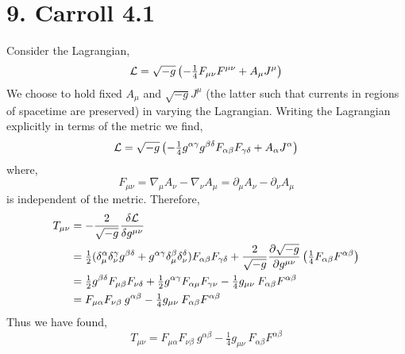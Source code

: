 \documentclass[12pt]{article}
\begin{document}
\section*{9. Carroll 4.1}

Consider the Lagrangian,
\[ \mathcal{L} = \sqrt{-g} \left( - \tfrac{1}{4} F_{\mu \nu} F^{\mu \nu} + A_\mu J^\mu \right) \]
We choose to hold fixed $A_\mu$ and $\sqrt{-g} J^\mu$ (the latter such that currents in regions of spacetime are preserved) in varying the Lagrangian. Writing the Lagrangian explicitly in terms of the metric we find,
\[ \mathcal{L} = \sqrt{-g} \left( - \tfrac{1}{4} g^{\alpha \gamma} g^{\beta \delta} F_{\alpha \beta} F_{\gamma \delta} + A_\alpha J^\alpha \right) \]
where,
\[ F_{\mu \nu} = \nabla_\mu A_\nu - \nabla_\nu A_\mu = \partial_\mu A_\nu - \partial_\nu A_\mu \]
is independent of the metric. Therefore,
\begin{align*}
T_{\mu \nu} & = - \frac{2}{\sqrt{-g}} \frac{\delta \mathcal{L}}{\delta g^{\mu \nu}}
\\
& = \tfrac{1}{2} (\delta_{\mu}^{\alpha} \delta_{\nu}^{\gamma} g^{\beta \delta} + g^{\alpha \gamma} \delta_{\mu}^{\beta} \delta_{\nu}^{\delta}) F_{\alpha \beta} F_{\gamma \delta} + \frac{2}{\sqrt{-g}} \frac{\partial \sqrt{-g}}{\partial g^{\mu \nu}} \left( \tfrac{1}{4} F_{\alpha \beta} F^{\alpha \beta} \right) 
\\
& = \tfrac{1}{2} g^{\beta \delta} F_{\mu \beta} F_{\nu \delta} + \tfrac{1}{2} g^{\alpha \gamma} F_{\alpha \mu} F_{\gamma \nu} - \tfrac{1}{4} g_{\mu \nu} \: F_{\alpha \beta} F^{\alpha \beta}   
\\
& = F_{\mu \alpha} F_{\nu \beta} \: g^{\alpha \beta} - \tfrac{1}{4} g_{\mu \nu} \: F_{\alpha \beta} F^{\alpha \beta}
\end{align*}
Thus we have found,
\[ T_{\mu \nu} =  F_{\mu \alpha} F_{\nu \beta} \: g^{\alpha \beta} - \tfrac{1}{4} g_{\mu \nu} \: F_{\alpha \beta} F^{\alpha \beta} \]
\end{document}

